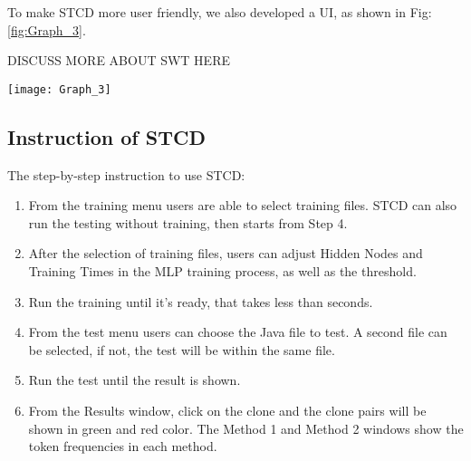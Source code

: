 \documentclass[../main.tex]{subfiles}
\begin{document}
To make STCD more user friendly, we also developed a UI, as shown in Fig:\ref{fig:Graph_3}.

DISCUSS MORE ABOUT SWT HERE

\begin{figure*}
\centering \texttt{[image: Graph\_3]} 
\caption{User Interface} \label{fig:Graph_3}
\end{figure*}

\subsection{Instruction of STCD}

The step-by-step instruction to use STCD:

\begin{enumerate}
\item From the training menu users are able to select training files. STCD can also run the testing without training, then starts from Step 4.
\item After the selection of training files, users can adjust Hidden Nodes and Training Times in the MLP training process, as well as the threshold. 
\item Run the training until it's ready, that takes less than seconds. 
\item From the test menu users can choose the Java file to test. A second file can be selected, if not, the test will be within the same file. 
\item Run the test until the result is shown.
\item From the Results window, click on the clone and the clone pairs will be shown in green and red color. The Method 1 and Method 2 windows show the token frequencies in each method.  
\end{enumerate}
\end{document}
